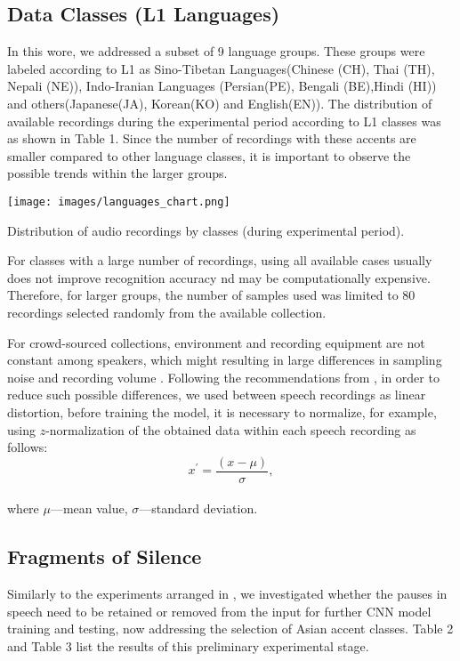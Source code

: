 \documentclass[ams]{U-AizuGT}
\begin{document}
\subsection{Data Classes (L1 Languages)}
In this wore, we addressed a subset of 9 language groups. These groups were labeled according to L1 as Sino-Tibetan Languages(Chinese (CH), Thai (TH), Nepali (NE)), Indo-Iranian Languages (Persian(PE), Bengali (BE),Hindi (HI)) and others(Japanese(JA), Korean(KO) and English(EN)). The distribution of available recordings during the experimental period according to L1 classes was as shown in Table 1. Since the number of recordings with these accents are smaller compared to other language classes, it is important to  observe the possible trends within the larger groups.
\begin{table}[h]
    \centering
    \texttt{[image: images/languages\_chart.png]}
    \caption{Distribution of audio recordings by classes (during experimental period).}
    
\end{table}
For classes with a large number of recordings, using all available cases usually does not improve recognition accuracy nd may be computationally expensive. Therefore, for larger groups, the number of samples used was limited to 80 recordings selected randomly from the available collection.\par
For crowd-sourced collections, environment and recording equipment are not constant among speakers, which might resulting in large differences in sampling noise and recording volume \cite{Ahamad:acc}.
Following the recommendations from \cite{Veranika:lang, Ahamad:acc}, in order to reduce such possible differences, we used between speech recordings as linear distortion, before training the model, it is necessary to normalize, for example, using $z$-normalization of the obtained data within each speech recording as follows:
\\
\begin{equation}
x^{\prime}=\frac{(x-\mu)}{\sigma},
\end{equation}
\\
where $\mu$---mean value, $\sigma$---standard deviation.

\subsection{Fragments of Silence}

Similarly to the experiments arranged in \cite{Veranika:lang, Boula:the}, we investigated whether the pauses in speech need to be retained or removed from the input for further CNN model training and testing, now addressing the selection of Asian accent classes. Table 2 and Table 3 list  the results of this preliminary experimental stage. 
\end{document}
